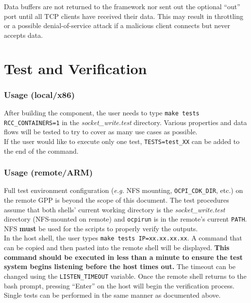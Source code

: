 \documentclass{article}
\begin{document}
Data buffers are not returned to the framework nor sent out the optional ``out'' port until all TCP clients have received their data. This may result in throttling or a possible denial-of-service attack if a malicious client connects but never accepts data.

\section*{Test and Verification}

\subsubsection*{Usage (local/x86)}
After building the component, the user needs to type \verb+make tests RCC_CONTAINERS=1+ in the \textit{socket\_write.test} directory. Various properties and data flows will be tested to try to cover as many use cases as possible. \\

If the user would like to execute only one test, \verb+TESTS=test_XX+ can be added to the end of the command.

\subsubsection*{Usage (remote/ARM)}
Full test environment configuration (\textit{e.g.} NFS mounting, \verb+OCPI_CDK_DIR+, etc.) on the remote GPP is beyond the scope of this document. The test procedures assume that both shells' current working directory is the \textit{socket\_write.test} directory (NFS-mounted on remote) and \verb+ocpirun+ is in the remote's current \verb+PATH+. NFS \textbf{must} be used for the scripts to properly verify the outputs. \\

In the host shell, the user types \verb+make tests IP=xx.xx.xx.xx+. A command that can be copied and then pasted into the remote shell will be displayed. \textbf{This command should be executed in less than a minute to ensure the test system begins listening before the host times out.} The timeout can be changed using the \verb+LISTEN_TIMEOUT+ variable. Once the remote shell returns to the bash prompt, pressing ``Enter'' on the host will begin the verification process. \\

Single tests can be performed in the same manner as documented above.
\end{document}
